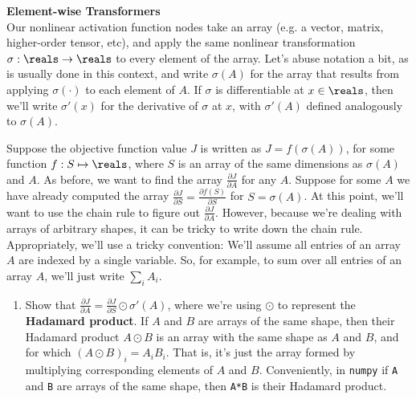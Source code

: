 \documentclass{article}
\newcommand{\nyuparagraph}[1]{\vspace{0.3cm}\textcolor{nyupurple}{\bf \large #1}\\}
\theoremstyle{plain}
\theoremstyle{definition}
\begin{document}
\nyuparagraph{Element-wise Transformers}

Our nonlinear activation function nodes take an array (e.g. a vector,
matrix, higher-order tensor, etc), and apply the same nonlinear transformation
$\sigma:\reals\to\reals$ to every element of the array. Let's abuse
notation a bit, as is usually done in this context, and write $\sigma(A)$
for the array that results from applying $\sigma(\cdot)$ to each
element of $A$. If $\sigma$ is differentiable at $x\in\reals$,
then we'll write $\sigma'(x)$ for the derivative of $\sigma$ at
$x$, with $\sigma'(A)$ defined analogously to $\sigma(A)$.

Suppose the objective function value $J$ is written as $J=f(\sigma(A))$,
for some function $f:S\mapsto\reals$, where $S$ is an array of the
same dimensions as $\sigma(A)$ and $A$. As before, we want to find
the array $\frac{\partial J}{\partial A}$ for any $A$. Suppose for
some $A$ we have already computed the array $\frac{\partial J}{\partial S}=\frac{\partial f(S)}{\partial S}$
for $S=\sigma(A)$. At this point, we'll want to use the chain rule
to figure out $\frac{\partial J}{\partial A}$. However, because we're
dealing with arrays of arbitrary shapes, it can be tricky to write
down the chain rule. Appropriately, we'll use a tricky convention:
We'll assume all entries of an array $A$ are indexed by a single
variable. So, for example, to sum over all entries of an array $A$,
we'll just write $\sum_{i}A_{i}$. 
\begin{enumerate}
\setcounter{enumi}{\value{saveenum}}
\item Show that $\frac{\partial J}{\partial A}=\frac{\partial J}{\partial S}\odot\sigma'(A)$,
where we're using $\odot$ to represent the \textbf{Hadamard product}.
If $A$ and $B$ are arrays of the same shape, then their Hadamard
product $A\odot B$ is an array with the same shape as $A$ and $B$,
and for which $\left(A\odot B\right)_{i}=A_{i}B_{i}$. That is, it's
just the array formed by multiplying corresponding elements of $A$
and $B$. Conveniently, in \texttt{numpy} if \texttt{A} and \texttt{B}
are arrays of the same shape, then \texttt{A{*}B} is their Hadamard
product.

\setcounter{saveenum}{\value{enumi}}
\end{enumerate}
\end{document}
